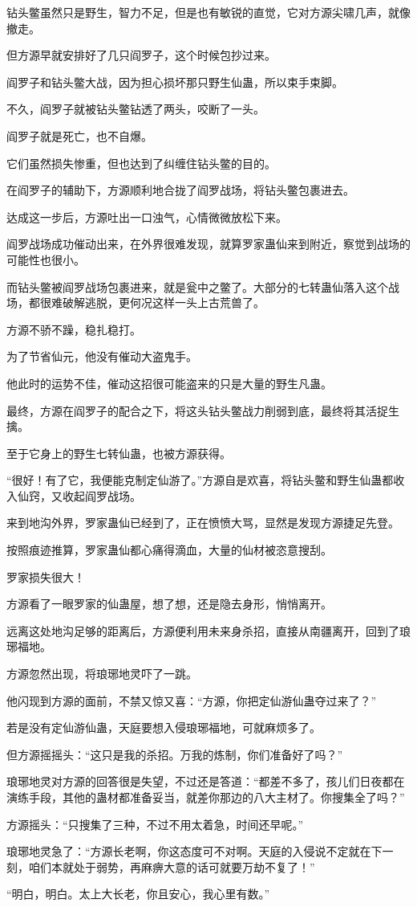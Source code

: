 \begin{this_body}
钻头鳖虽然只是野生，智力不足，但是也有敏锐的直觉，它对方源尖啸几声，就像撤走。

但方源早就安排好了几只阎罗子，这个时候包抄过来。

阎罗子和钻头鳖大战，因为担心损坏那只野生仙蛊，所以束手束脚。

不久，阎罗子就被钻头鳖钻透了两头，咬断了一头。

阎罗子就是死亡，也不自爆。

它们虽然损失惨重，但也达到了纠缠住钻头鳖的目的。

在阎罗子的辅助下，方源顺利地合拢了阎罗战场，将钻头鳖包裹进去。

达成这一步后，方源吐出一口浊气，心情微微放松下来。

阎罗战场成功催动出来，在外界很难发现，就算罗家蛊仙来到附近，察觉到战场的可能性也很小。

而钻头鳖被阎罗战场包裹进来，就是瓮中之鳖了。大部分的七转蛊仙落入这个战场，都很难破解逃脱，更何况这样一头上古荒兽了。

方源不骄不躁，稳扎稳打。

为了节省仙元，他没有催动大盗鬼手。

他此时的运势不佳，催动这招很可能盗来的只是大量的野生凡蛊。

最终，方源在阎罗子的配合之下，将这头钻头鳖战力削弱到底，最终将其活捉生擒。

至于它身上的野生七转仙蛊，也被方源获得。

“很好！有了它，我便能克制定仙游了。”方源自是欢喜，将钻头鳖和野生仙蛊都收入仙窍，又收起阎罗战场。

来到地沟外界，罗家蛊仙已经到了，正在愤愤大骂，显然是发现方源捷足先登。

按照痕迹推算，罗家蛊仙都心痛得滴血，大量的仙材被恣意搜刮。

罗家损失很大！

方源看了一眼罗家的仙蛊屋，想了想，还是隐去身形，悄悄离开。

远离这处地沟足够的距离后，方源便利用未来身杀招，直接从南疆离开，回到了琅琊福地。

方源忽然出现，将琅琊地灵吓了一跳。

他闪现到方源的面前，不禁又惊又喜：“方源，你把定仙游仙蛊夺过来了？”

若是没有定仙游仙蛊，天庭要想入侵琅琊福地，可就麻烦多了。

但方源摇摇头：“这只是我的杀招。万我的炼制，你们准备好了吗？”

琅琊地灵对方源的回答很是失望，不过还是答道：“都差不多了，孩儿们日夜都在演练手段，其他的蛊材都准备妥当，就差你那边的八大主材了。你搜集全了吗？”

方源摇头：“只搜集了三种，不过不用太着急，时间还早呢。”

琅琊地灵急了：“方源长老啊，你这态度可不对啊。天庭的入侵说不定就在下一刻，咱们本就处于弱势，再麻痹大意的话可就要万劫不复了！”

“明白，明白。太上大长老，你且安心，我心里有数。”

\end{this_body}

